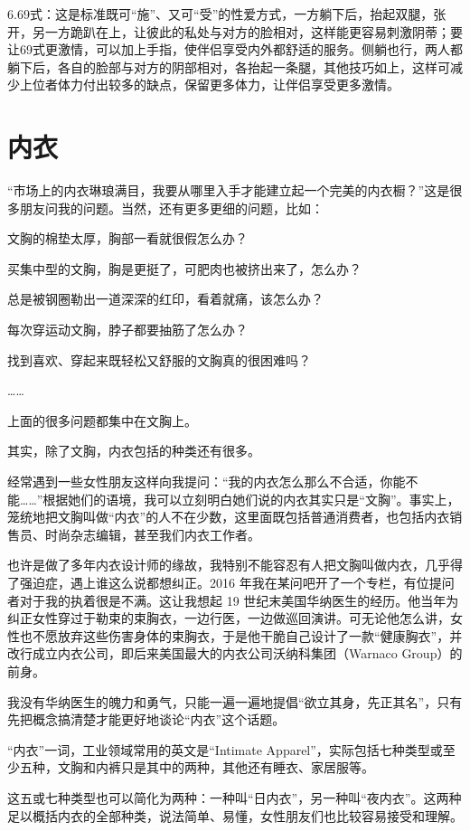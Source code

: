 \documentclass[12pt,UTF8]{ctexbook}
\begin{document}
6.69式：这是标准既可“施”、又可“受”的性爱方式，一方躺下后，抬起双腿，张开，另一方跪趴在上，让彼此的私处与对方的脸相对，这样能更容易刺激阴蒂；要让69式更激情，可以加上手指，使伴侣享受内外都舒适的服务。侧躺也行，两人都躺下后，各自的脸部与对方的阴部相对，各抬起一条腿，其他技巧如上，这样可减少上位者体力付出较多的缺点，保留更多体力，让伴侣享受更多激情。


\part{内衣}

“市场上的内衣琳琅满目，我要从哪里入手才能建立起一个完美的内衣橱？”这是很多朋友问我的问题。当然，还有更多更细的问题，比如：

文胸的棉垫太厚，胸部一看就很假怎么办？

买集中型的文胸，胸是更挺了，可肥肉也被挤出来了，怎么办？

总是被钢圈勒出一道深深的红印，看着就痛，该怎么办？

每次穿运动文胸，脖子都要抽筋了怎么办？

找到喜欢、穿起来既轻松又舒服的文胸真的很困难吗？

……

上面的很多问题都集中在文胸上。


其实，除了文胸，内衣包括的种类还有很多。

经常遇到一些女性朋友这样向我提问：“我的内衣怎么那么不合适，你能不能……”根据她们的语境，我可以立刻明白她们说的内衣其实只是“文胸”。事实上，笼统地把文胸叫做“内衣”的人不在少数，这里面既包括普通消费者，也包括内衣销售员、时尚杂志编辑，甚至我们内衣工作者。

也许是做了多年内衣设计师的缘故，我特别不能容忍有人把文胸叫做内衣，几乎得了强迫症，遇上谁这么说都想纠正。2016 年我在某问吧开了一个专栏，有位提问者对于我的执着很是不满。这让我想起 19 世纪末美国华纳医生的经历。他当年为纠正女性穿过于勒束的束胸衣，一边行医，一边做巡回演讲。可无论他怎么讲，女性也不愿放弃这些伤害身体的束胸衣，于是他干脆自己设计了一款“健康胸衣”，并改行成立内衣公司，即后来美国最大的内衣公司沃纳科集团（Warnaco Group）的前身。

我没有华纳医生的魄力和勇气，只能一遍一遍地提倡“欲立其身，先正其名”，只有先把概念搞清楚才能更好地谈论“内衣”这个话题。

“内衣”一词，工业领域常用的英文是“Intimate Apparel”，实际包括七种类型或至少五种，文胸和内裤只是其中的两种，其他还有睡衣、家居服等。

这五或七种类型也可以简化为两种：一种叫“日内衣”，另一种叫“夜内衣”。这两种足以概括内衣的全部种类，说法简单、易懂，女性朋友们也比较容易接受和理解。
\end{document}

